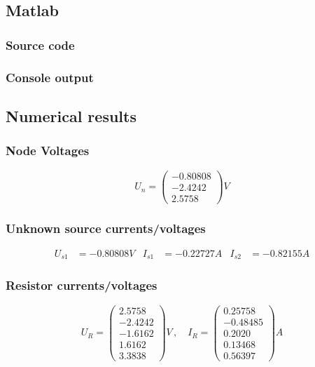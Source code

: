 \documentclass[a4paper]{article}
\begin{document}
\subsection{Matlab}
\subsubsection{Source code}
  
\subsubsection{Console output}
  
\vspace{2mm}
\subsection{Numerical results}
\subsubsection{Node Voltages}
\begin{equation*}
   U_n = 
   \begin{pmatrix}
      -0.80808 \\ -2.4242 \\ 2.5758
   \end{pmatrix}
   V
\end{equation*}
\subsubsection{Unknown source currents/voltages}
\begin{align*}
   U_{s1} &= -0.80808 V &
   I_{s1} &= -0.22727 A &
   I_{s2} &= -0.82155 A
\end{align*}   
\subsubsection{Resistor currents/voltages}
\begin{equation*}
   U_R =
   \begin{pmatrix}
      2.5758\\ -2.4242\\ -1.6162\\ 1.6162 \\ 3.3838
   \end{pmatrix}
   V\,, \quad
   I_R =
   \begin{pmatrix}
      0.25758\\ -0.48485\\ 0.2020\\ 0.13468 \\ 0.56397
   \end{pmatrix}
   A
\end{equation*}
\end{document}
